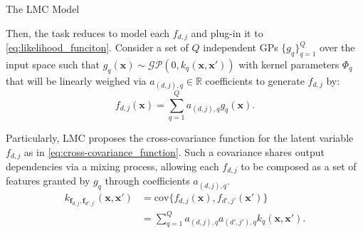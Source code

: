 \begin{frame}{The LMC Model}
	
Then, the task reduces to model each \(f_{d,j}\) and plug-in it to \cref{eq:likelihood_funciton}. Consider a set of \( Q \) independent GPs \( \{ g_q \}_{q=1}^Q \) over the input space such that \( g_q(\boldsymbol{x}) \sim \mathcal{GP}(0, k_q(\boldsymbol{x}, \boldsymbol{x}'))\) with kernel parameters \( \Phi_q \) that will be linearly weighed via \( a_{(d,j),q} \in \mathbb{R} \) coefficients to generate \( f_{d,j} \) by:
\begin{equation}\label{eq:lmc_process}
	f_{d,j}(\boldsymbol{x}) = \sum_{q=1}^Q a_{(d,j),q} g_{q}(\boldsymbol{x}).
\end{equation}

Particularly, LMC proposes the cross-covariance function for the latent variable \( f_{d,j} \) as in \cref{eq:cross-covariance_function}. Such a covariance shares output dependencies via a mixing process, allowing each \( f_{d,j} \) to be composed as a set of features granted by \( g_q \) through coefficients \( a_{(d,j),q} \).
\begin{equation}
	\begin{split}\label{eq:cross-covariance_function}
		k_{\boldsymbol{f}_{d,j}, \boldsymbol{f}_{d',j'}}(\boldsymbol{x}, \boldsymbol{x}') &= \text{cov}\{f_{d,j}(\boldsymbol{x}), f_{d',j'}(\boldsymbol{x}')\}\\
		&=\sum_{q=1}^Q a_{(d,j),q}a_{(d',j'),q} k_{q}(\boldsymbol{x}, \boldsymbol{x}').
	\end{split}
\end{equation}

\end{frame}